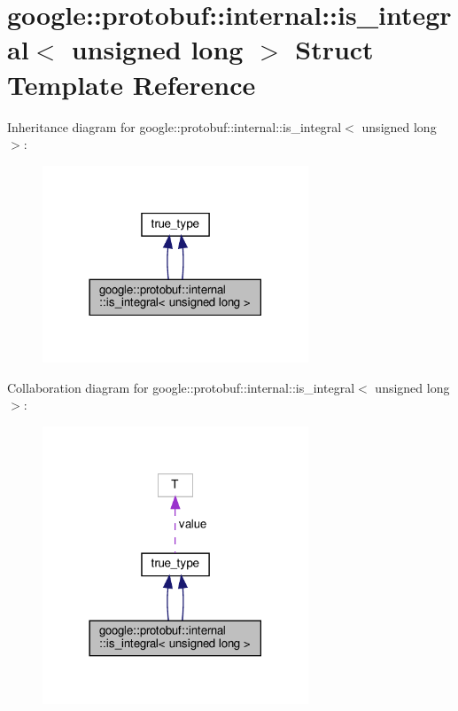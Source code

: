 \hypertarget{structgoogle_1_1protobuf_1_1internal_1_1is__integral_3_01unsigned_01long_01_4}{}\section{google\+:\+:protobuf\+:\+:internal\+:\+:is\+\_\+integral$<$ unsigned long $>$ Struct Template Reference}
\label{structgoogle_1_1protobuf_1_1internal_1_1is__integral_3_01unsigned_01long_01_4}


Inheritance diagram for google\+:\+:protobuf\+:\+:internal\+:\+:is\+\_\+integral$<$ unsigned long $>$\+:
\nopagebreak
\begin{figure}[H]
\begin{center}
\leavevmode
\includegraphics[width=225pt]{structgoogle_1_1protobuf_1_1internal_1_1is__integral_3_01unsigned_01long_01_4__inherit__graph}
\end{center}
\end{figure}


Collaboration diagram for google\+:\+:protobuf\+:\+:internal\+:\+:is\+\_\+integral$<$ unsigned long $>$\+:
\nopagebreak
\begin{figure}[H]
\begin{center}
\leavevmode
\includegraphics[width=225pt]{structgoogle_1_1protobuf_1_1internal_1_1is__integral_3_01unsigned_01long_01_4__coll__graph}
\end{center}
\end{figure}
